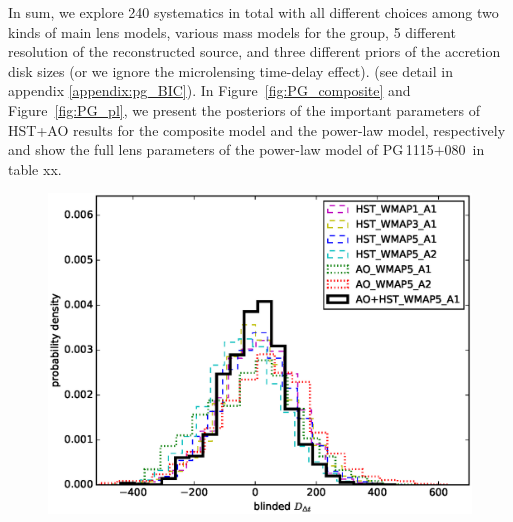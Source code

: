 \documentclass[useAMS,usenatbib]{mnras}
\newcommand\pg{PG\,1115$+$080}
\newcommand{\fref}[1]{Figure~\ref{#1}}
\begin{document}
In sum, we explore 240 systematics in total with all different choices among two kinds of main lens models, various mass models for the group, 5 different resolution of the reconstructed source, and three different priors of the accretion disk sizes (or we ignore the microlensing time-delay effect). (see detail in appendix \ref{appendix:pg_BIC}). 
In \fref{fig:PG_composite} and \fref{fig:PG_pl}, we present the posteriors of the important parameters of HST+AO results for the composite model and the power-law model, respectively and show the full lens parameters of the power-law model of \pg~in table xx. 

\begin{figure}
\includegraphics[scale=0.43]{PG1115_systematics_tests.eps}
\caption{}
\label{fig:PG1115_Ddt}
\end{figure}
\end{document}
